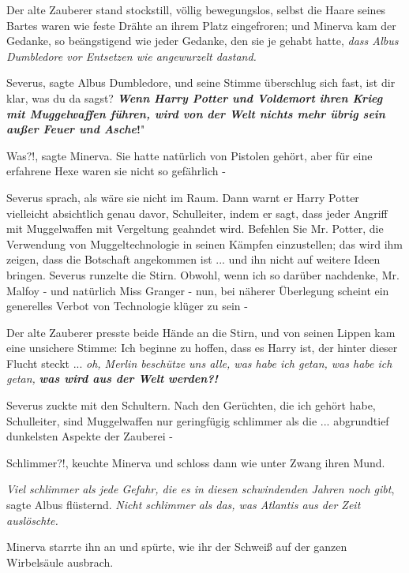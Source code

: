 Der alte Zauberer stand stockstill, völlig bewegungslos, selbst die Haare seines
Bartes waren wie feste Drähte an ihrem Platz eingefroren; und Minerva kam der
Gedanke, so beängstigend wie jeder Gedanke, den sie je gehabt hatte, \emph{dass
Albus Dumbledore vor Entsetzen wie angewurzelt dastand.}

\glqq{}Severus\grqq{}, sagte Albus Dumbledore, und seine Stimme überschlug sich
fast, \glqq{}ist dir klar, was du da sagst? \textbf{\emph{Wenn Harry Potter und
Voldemort ihren Krieg mit Muggelwaffen führen, wird von der Welt nichts mehr
übrig sein außer Feuer und Asche}}\textbf{!}"

\glqq{}Was?!\grqq{}, sagte Minerva. Sie hatte natürlich von Pistolen gehört, aber
für eine erfahrene Hexe waren sie nicht so gefährlich -

Severus sprach, als wäre sie nicht im Raum. \glqq{}Dann warnt er Harry Potter
vielleicht absichtlich genau davor, Schulleiter, indem er sagt, dass jeder
Angriff mit Muggelwaffen mit Vergeltung geahndet wird. Befehlen Sie Mr. Potter,
die Verwendung von Muggeltechnologie in seinen Kämpfen einzustellen; das wird
ihm zeigen, dass die Botschaft angekommen ist ... und ihn nicht auf weitere
Ideen bringen.\grqq{} Severus runzelte die Stirn. \glqq{}Obwohl, wenn ich so
darüber nachdenke, Mr. Malfoy - und natürlich Miss Granger - nun, bei näherer
Überlegung scheint ein generelles Verbot von Technologie klüger zu sein -\grqq{}

Der alte Zauberer presste beide Hände an die Stirn, und von seinen Lippen kam
eine unsichere Stimme: \glqq{}Ich beginne zu hoffen, dass es Harry ist, der
hinter dieser Flucht steckt ... \emph{oh, Merlin beschütze uns alle, was habe
ich getan, was habe ich getan,} \textbf{\emph{was wird aus der Welt
werden?!}}\grqq{}

Severus zuckte mit den Schultern. \glqq{}Nach den Gerüchten, die ich gehört habe,
Schulleiter, sind Muggelwaffen nur geringfügig schlimmer als die ... abgrundtief
dunkelsten Aspekte der Zauberei -\grqq{}

\glqq{}Schlimmer?!\grqq{}, keuchte Minerva und schloss dann wie unter Zwang ihren
Mund.

\glqq{}\emph{Viel} \emph{schlimmer als jede Gefahr, die es in diesen schwindenden
Jahren noch gibt}\grqq{}, sagte Albus flüsternd. \glqq{}\emph{Nicht schlimmer als
das, was Atlantis aus der Zeit auslöschte.}\grqq{}

Minerva starrte ihn an und spürte, wie ihr der Schweiß auf der ganzen
Wirbelsäule ausbrach.

